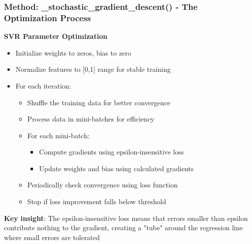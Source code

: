 \documentclass{beamer}
\begin{document}
\begin{frame}
\frametitle{Method: \_stochastic\_gradient\_descent() - The Optimization Process}
    \textbf{SVR Parameter Optimization}
    \begin{itemize}
        \item Initialize weights to zeros, bias to zero
        \item Normalize features to [0,1] range for stable training
        \item For each iteration:
        \begin{itemize}
            \item Shuffle the training data for better convergence
            \item Process data in mini-batches for efficiency
            \item For each mini-batch:
            \begin{itemize}
                \item Compute gradients using epsilon-insensitive loss
                \item Update weights and bias using calculated gradients
            \end{itemize}
            \item Periodically check convergence using loss function
            \item Stop if loss improvement falls below threshold
        \end{itemize}
    \end{itemize}
    
    \textbf{Key insight}: The epsilon-insensitive loss means that errors smaller than epsilon contribute nothing to the gradient, creating a "tube" around the regression line where small errors are tolerated
\end{frame}
\end{document}
